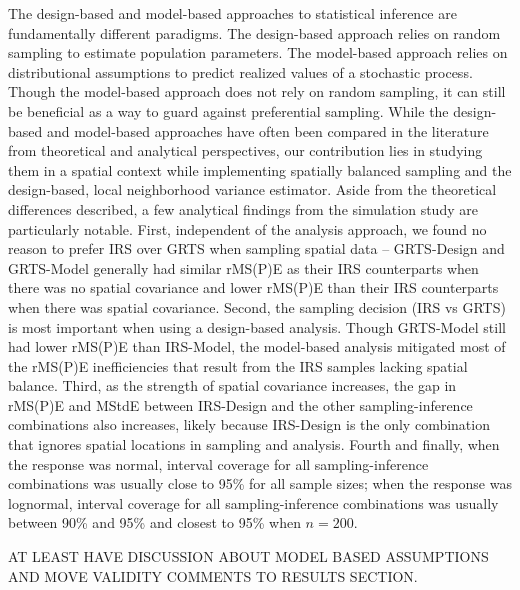 \documentclass[]{elsarticle} %
\begin{document}
The design-based and model-based approaches to statistical inference are
fundamentally different paradigms. The design-based approach relies on
random sampling to estimate population parameters. The model-based
approach relies on distributional assumptions to predict realized values
of a stochastic process. Though the model-based approach does not rely
on random sampling, it can still be beneficial as a way to guard against
preferential sampling. While the design-based and model-based approaches
have often been compared in the literature from theoretical and
analytical perspectives, our contribution lies in studying them in a
spatial context while implementing spatially balanced sampling and the
design-based, local neighborhood variance estimator. Aside from the
theoretical differences described, a few analytical findings from the
simulation study are particularly notable. First, independent of the
analysis approach, we found no reason to prefer IRS over GRTS when
sampling spatial data -- GRTS-Design and GRTS-Model generally had
similar rMS(P)E as their IRS counterparts when there was no spatial
covariance and lower rMS(P)E than their IRS counterparts when there was
spatial covariance. Second, the sampling decision (IRS vs GRTS) is most
important when using a design-based analysis. Though GRTS-Model still
had lower rMS(P)E than IRS-Model, the model-based analysis mitigated
most of the rMS(P)E inefficiencies that result from the IRS samples
lacking spatial balance. Third, as the strength of spatial covariance
increases, the gap in rMS(P)E and MStdE between IRS-Design and the other
sampling-inference combinations also increases, likely because
IRS-Design is the only combination that ignores spatial locations in
sampling and analysis. Fourth and finally, when the response was normal,
interval coverage for all sampling-inference combinations was usually
close to 95\% for all sample sizes; when the response was lognormal,
interval coverage for all sampling-inference combinations was usually
between 90\% and 95\% and closest to 95\% when \(n = 200\).

AT LEAST HAVE DISCUSSION ABOUT MODEL BASED ASSUMPTIONS AND MOVE VALIDITY
COMMENTS TO RESULTS SECTION.
\end{document}
